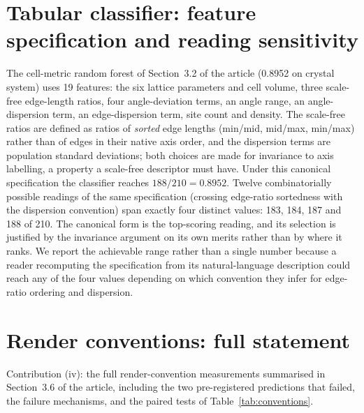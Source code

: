 \section{Tabular classifier: feature specification and reading sensitivity}
\label{app:classifier}
The cell-metric random forest of Section~3.2 of the article (0.8952 on crystal system) uses 19 features: the
six lattice parameters and cell volume, three scale-free edge-length ratios, four angle-deviation terms, an
angle range, an angle-dispersion term, an edge-dispersion term, site count and density. The scale-free
ratios are defined as ratios of \emph{sorted} edge lengths (min/mid, mid/max, min/max) rather than of
edges in their native axis order, and the dispersion terms are population standard deviations; both choices
are made for invariance to axis labelling, a property a scale-free descriptor must have. Under this
canonical specification the classifier reaches $188/210=0.8952$.
Twelve combinatorially possible readings of the same specification (crossing edge-ratio sortedness with
the dispersion convention) span exactly four distinct values: 183, 184, 187 and 188 of 210. The canonical
form is the top-scoring reading, and its selection is justified by the invariance argument on its own
merits rather than by where it ranks. We report the achievable range rather than a single number because a
reader recomputing the specification from its natural-language description could reach any of the four
values depending on which convention they infer for edge-ratio ordering and dispersion.

\section{Render conventions: full statement}
\label{app:conventions}
Contribution (iv): the full render-convention measurements summarised in Section~3.6 of the article,
including the two pre-registered predictions that failed, the failure mechanisms, and the paired tests of
Table~\ref{tab:conventions}.

